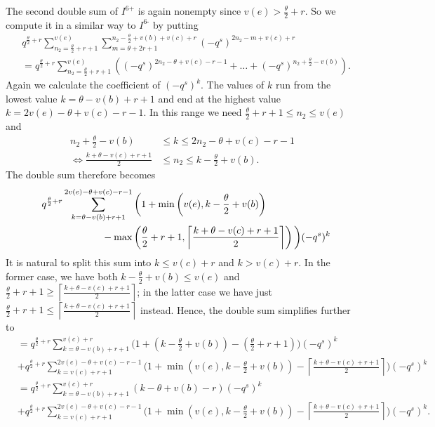 The second double sum of $I^{\text{6+}}$ is again nonempty
since $v(e) > \frac{\theta}{2} + r$.
So we compute it
in a similar way to $I^{\text{6-}}$ by putting
\begin{align*}
  &q^{\frac{\theta}{2} + r} \sum_{n_2 = \frac{\theta}{2} + r + 1}^{v(e)}
  \sum_{m = \theta + 2r + 1}^{n_2 - \frac{\theta}{2} + v(b) + v(c) + r}
    (-q^s)^{2n_2 - m + v(c) + r} \\
  &= q^{\frac{\theta}{2} + r} \sum_{n_2 = \frac{\theta}{2} + r + 1}^{v(e)}
  \left(
    (-q^s)^{2n_2 - \theta + v(c) - r - 1}
    + \dots
    + (-q^s)^{n_2 + \frac{\theta}{2} - v(b)}
  \right).
\end{align*}
Again we calculate the coefficient of $(-q^s)^k$.
The values of $k$ run from the lowest value $k = \theta - v(b) + r + 1$
and end at the highest value $k = 2v(e) - \theta + v(c) - r - 1$.
In this range we need $\frac{\theta}{2} + r + 1 \le n_2 \le v(e)$ and
\begin{align*}
  n_2 + \frac{\theta}{2} - v(b) &\le k \le 2n_2 - \theta + v(c) - r - 1 \\
  \iff \frac{k + \theta - v(c) + r + 1}{2} &\le n_2 \le k - \frac{\theta}{2} + v(b).
\end{align*}
The double sum therefore becomes
\begin{align*}
  &\phantom=
  q^{\frac{\theta}{2} + r}
  \sum_{k = \theta - v(b) + r + 1}^{2v(e) - \theta + v(c) - r - 1}
  \bigg( 1 + \min\left( v(e), k - \frac{\theta}{2} + v(b) \right) \\
    &\hspace{16ex} - \max\left( \frac{\theta}{2} + r + 1,
      \left\lceil \frac{k + \theta - v(c) + r + 1}{2} \right\rceil \right) \bigg) (-q^s)^k
\end{align*}
It is natural to split this sum into $k \le v(c) + r$ and $k > v(c) + r$.
In the former case, we have both $k - \frac{\theta}{2} + v(b) \le v(e)$
and $\frac{\theta}{2} + r + 1 \ge \left\lceil \frac{k + \theta - v(c) + r + 1}{2} \right\rceil$;
in the latter case we have just
$\frac{\theta}{2} + r + 1 \le \left\lceil \frac{k + \theta - v(c) + r + 1}{2} \right\rceil$
instead.
Hence, the double sum simplifies further to
\begin{align*}
  &= q^{\frac{\theta}{2} + r}
  \sum_{k = \theta - v(b) + r + 1}^{v(c) + r}
  \bigg( 1 + \left( k - \frac{\theta}{2} + v(b) \right)
    - \left( \frac{\theta}{2} + r + 1 \right) \bigg) (-q^s)^k \\
  &+ q^{\frac{\theta}{2} + r}
  \sum_{k = v(c) + r + 1}^{2v(e) - \theta + v(c) - r - 1}
  \bigg( 1 + \min\left( v(e), k - \frac{\theta}{2} + v(b) \right)
    - \left\lceil \frac{k + \theta - v(c) + r + 1}{2} \right\rceil \bigg) (-q^s)^k \\
  &= q^{\frac{\theta}{2} + r}
  \sum_{k = \theta - v(b) + r + 1}^{v(c) + r}
  \left( k - \theta + v(b) - r \right) (-q^s)^k \\
  &+ q^{\frac{\theta}{2} + r}
  \sum_{k = v(c) + r + 1}^{2v(e) - \theta + v(c) - r - 1}
  \bigg( 1 + \min\left( v(e), k - \frac{\theta}{2} + v(b) \right)
    - \left\lceil \frac{k + \theta - v(c) + r + 1}{2} \right\rceil \bigg) (-q^s)^k.
\end{align*}
